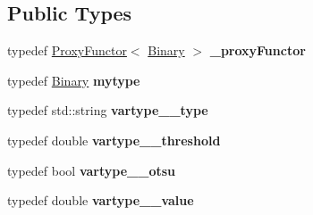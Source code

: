\subsection*{Public Types}
\begin{DoxyCompactItemize}
\item 
\mbox{\label{classfilter_1_1algos_1_1_binary_a48e7bac071c051082cec4d438b9c14c0}} 
typedef \hyperlink{class_proxy_functor}{Proxy\+Functor}$<$ \hyperlink{classfilter_1_1algos_1_1_binary}{Binary} $>$ {\bfseries \+\_\+proxy\+Functor}
\item 
\mbox{\label{classfilter_1_1algos_1_1_binary_a803341d1e8b5a196f8f9023e054558be}} 
typedef \hyperlink{classfilter_1_1algos_1_1_binary}{Binary} {\bfseries mytype}
\item 
\mbox{\label{classfilter_1_1algos_1_1_binary_a53eb4696a4ba07aa396ec5e187cafcb4}} 
typedef std\+::string {\bfseries vartype\+\_\+\+\_\+type}
\item 
\mbox{\label{classfilter_1_1algos_1_1_binary_a94cd49147e761efe7af0c2fd7c518776}} 
typedef double {\bfseries vartype\+\_\+\+\_\+threshold}
\item 
\mbox{\label{classfilter_1_1algos_1_1_binary_a4d7b9d5f5efc7ad3c804e3090307042c}} 
typedef bool {\bfseries vartype\+\_\+\+\_\+otsu}
\item 
\mbox{\label{classfilter_1_1algos_1_1_binary_a6b79a74f8c01c2b5c896cb026bb80cac}} 
typedef double {\bfseries vartype\+\_\+\+\_\+value}
\end{DoxyCompactItemize}
